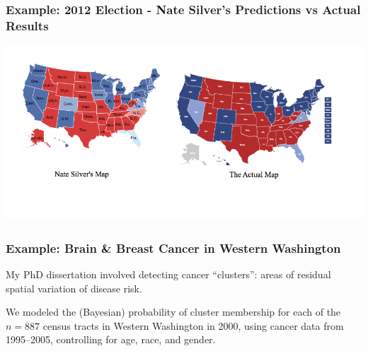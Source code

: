 \documentclass[slides]{beamer}
\newcommand{\blue}[1]{\textcolor{blue2}{#1}}
\begin{document}
\begin{frame}[fragile]
\frametitle{Example: 2012 Election - Nate Silver's Predictions vs Actual Results}
\begin{center}
\includegraphics[width=\textwidth]{figure/nate_silver.jpg}
\end{center}
\begin{center}
\end{center}
\end{frame}


\begin{frame}[fragile]
\frametitle{Example: Brain \& Breast Cancer in Western Washington}

My PhD dissertation involved detecting cancer ``clusters'': areas of \blue{residual spatial variation} of disease risk.

\vspace{0.5cm}

\pause We modeled the (Bayesian) probability of cluster membership for each of the $n=887$ census tracts in Western Washington in 2000, using cancer data from 1995--2005, controlling for age, race, and gender.  


\end{frame}
\end{document}
